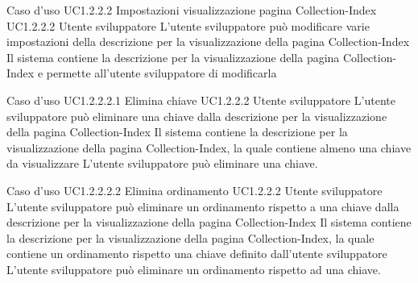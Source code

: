 \UCtitle
{Caso d'uso UC1.2.2.2}
{Impostazioni visualizzazione pagina Collection-Index}
\UC
{UC1.2.2.2}
{Utente sviluppatore}
{L'utente sviluppatore  può modificare varie impostazioni della descrizione per la visualizzazione della pagina Collection-Index}
{Il sistema contiene la descrizione per la visualizzazione della pagina Collection-Index e permette all'utente sviluppatore di modificarla}

\UCtitle
{Caso d'uso UC1.2.2.2.1}
{Elimina chiave}
\UC
{UC1.2.2.2}
{Utente sviluppatore}
{L'utente sviluppatore  può eliminare una chiave dalla descrizione per la visualizzazione della pagina Collection-Index}
{Il sistema contiene la descrizione per la visualizzazione della pagina Collection-Index, la quale contiene almeno una chiave da visualizzare}
\scenario
{L'utente sviluppatore può eliminare una chiave.}


\UCtitle
{Caso d'uso UC1.2.2.2.2}
{Elimina ordinamento}
\UC
{UC1.2.2.2}
{Utente sviluppatore}
{L'utente sviluppatore  può eliminare un ordinamento rispetto a una chiave dalla descrizione per la visualizzazione della pagina Collection-Index}
{Il sistema contiene la descrizione per la visualizzazione della pagina Collection-Index, la quale contiene un ordinamento rispetto una chiave definito dall'utente sviluppatore}
\scenario
{L'utente sviluppatore può eliminare un ordinamento rispetto ad una chiave.}


